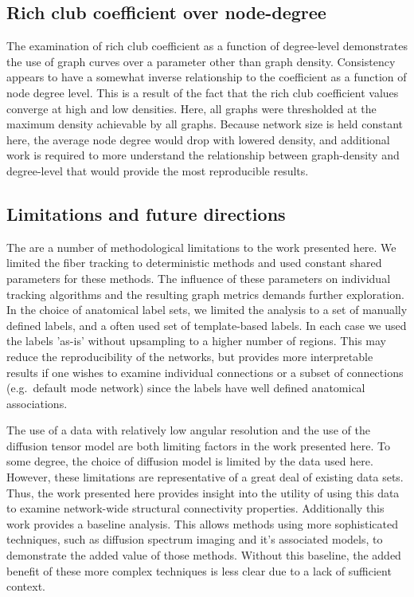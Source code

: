 \documentclass{frontiersSCNS} %
\begin{document}
\subsection{Rich club coefficient over node-degree}
The examination of rich club coefficient as a function of degree-level demonstrates the use of graph curves over 
a parameter other than graph density. Consistency appears to have a somewhat inverse relationship to the 
coefficient as a function of node degree level. This is a result of the fact that the rich club coefficient values converge
at high and low densities. Here, all graphs were thresholded at the maximum density achievable by all graphs. 
Because network size is held constant here, the average node degree would drop with lowered density, 
and additional work is required to more understand the relationship between graph-density and degree-level that 
would provide the most reproducible results. 

\subsection{Limitations and future directions}
The are a number of methodological limitations to the work presented here. We limited the fiber tracking to deterministic
methods and used constant shared parameters for these methods. The influence of these parameters on individual 
tracking algorithms and the resulting graph metrics demands further exploration. In the choice of anatomical label sets, we
limited the analysis to a set of manually defined labels, and a often used set of template-based labels. In each case we used the labels
'as-is' without upsampling to a higher number of regions. This may reduce the reproducibility of the networks, but provides
more interpretable results if one wishes to examine individual connections or a subset of connections (e.g.\ default mode network)
since the labels have well defined anatomical associations.

The use of a data with relatively low angular resolution and the use
of the diffusion tensor model are both limiting factors in the work presented
here. To some degree, the choice of diffusion model is limited by the
data used here. However, these limitations are representative of a
great deal of existing data sets. Thus, the work presented here
provides insight into the utility of using this data to examine
network-wide structural connectivity properties. Additionally this
work provides a baseline analysis. This allows methods using more sophisticated
techniques, such as diffusion spectrum imaging and it's associated
models, to demonstrate the added value of those methods. Without this
baseline, the added benefit of these more complex techniques is less
clear due to a lack of sufficient context.
\end{document}
